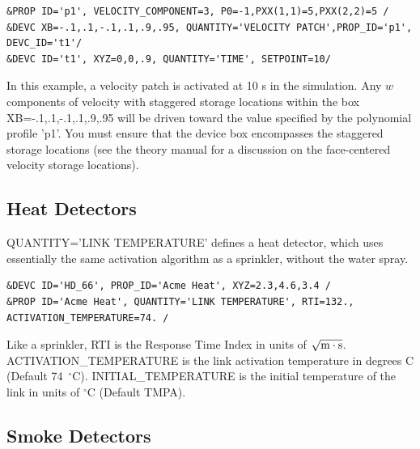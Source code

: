 \documentclass[11pt]{book}
\begin{document}
\begin{lstlisting}
&PROP ID='p1', VELOCITY_COMPONENT=3, P0=-1,PXX(1,1)=5,PXX(2,2)=5 /
&DEVC XB=-.1,.1,-.1,.1,.9,.95, QUANTITY='VELOCITY PATCH',PROP_ID='p1', DEVC_ID='t1'/
&DEVC ID='t1', XYZ=0,0,.9, QUANTITY='TIME', SETPOINT=10/
\end{lstlisting}
In this example, a velocity patch is activated at 10 s in the simulation.  Any $w$ components of velocity with staggered storage locations within the box {\ct XB=-.1,.1,-.1,.1,.9,.95} will be driven toward the value specified by the polynomial profile {\ct 'p1'}.  You must ensure that the device box encompasses the staggered storage locations (see the theory manual \cite{FDS_Math_Guide} for a discussion on the face-centered velocity storage locations).

\subsection{Heat Detectors}
\label{info:heat_detectors}

{\ct QUANTITY='LINK TEMPERATURE'} defines a heat detector, which uses essentially the same activation algorithm as a sprinkler, without the water spray.
\begin{lstlisting}
&DEVC ID='HD_66', PROP_ID='Acme Heat', XYZ=2.3,4.6,3.4 /
&PROP ID='Acme Heat', QUANTITY='LINK TEMPERATURE', RTI=132., ACTIVATION_TEMPERATURE=74. /
\end{lstlisting}
Like a sprinkler, {\ct RTI} is the Response Time Index in units of $\sqrt{\hbox{m}\cdot \hbox{s}}$. {\ct ACTIVATION\_TEMPERATURE} is the link activation temperature in degrees C (Default 74~$^\circ$C). {\ct INITIAL\_TEMPERATURE} is the initial temperature of the link in units of $^\circ$C (Default {\ct TMPA}).



\subsection{Smoke Detectors}
\label{info:smoke_detector}
\end{document}
